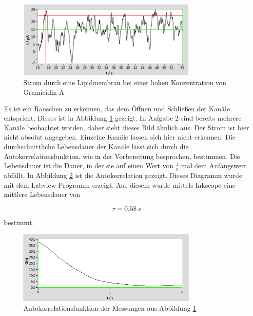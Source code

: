 \documentclass[a4paper,ngerman]{scrartcl}
\begin{document}
\begin{figure}[tbh!]
\includegraphics[width=0.8\textwidth]{abbildungen/mehrkanal_raw.png}
\caption{Strom durch eine Lipidmembran bei einer hohen Konzentration von Gramicidin A}
\label{fig:mehrkanal-roh}
\end{figure}


Es ist ein Rauschen zu erkennen, das dem Öffnen und Schließen der Kanäle entspricht. Dieses ist in Abbildung \ref{fig:mehrkanal-roh} gezeigt. In Aufgabe 2 sind bereits mehrere Kanäle beobachtet worden, daher sieht dieses Bild ähnlich aus. Der Strom ist hier nicht absolut angegeben. Einzelne Kanäle lassen sich hier nicht erkennen. Die durchschnittliche Lebensdauer der Kanäle lässt sich durch die Autokorrelationsfunktion, wie in der Vorbereitung besprochen, bestimmen. Die Lebensdauer ist die Dauer, in der sie auf einen Wert von $\frac{1}{e}$ mal dem Anfangswert abfällt. In Abbildung \ref{fig:mehrkanal-korrel} ist die Autokorrelation gezeigt. Dieses Diagramm wurde mit dem Labview-Programm erzeigt. Aus diesem wurde mittels Inkscape eine mittlere Lebensdauer von

\begin{equation}
\tau = \SI{0.58}{s}
\end{equation}

bestimmt.

\begin{figure}[tbh!]
\includegraphics[width=0.8\textwidth]{abbildungen/mehrkanal_korrel.png}
\caption{Autokorrelationsfunktion der Messungen aus Abbildung \ref{fig:mehrkanal-roh}}
\label{fig:mehrkanal-korrel}
\end{figure}
\end{document}

